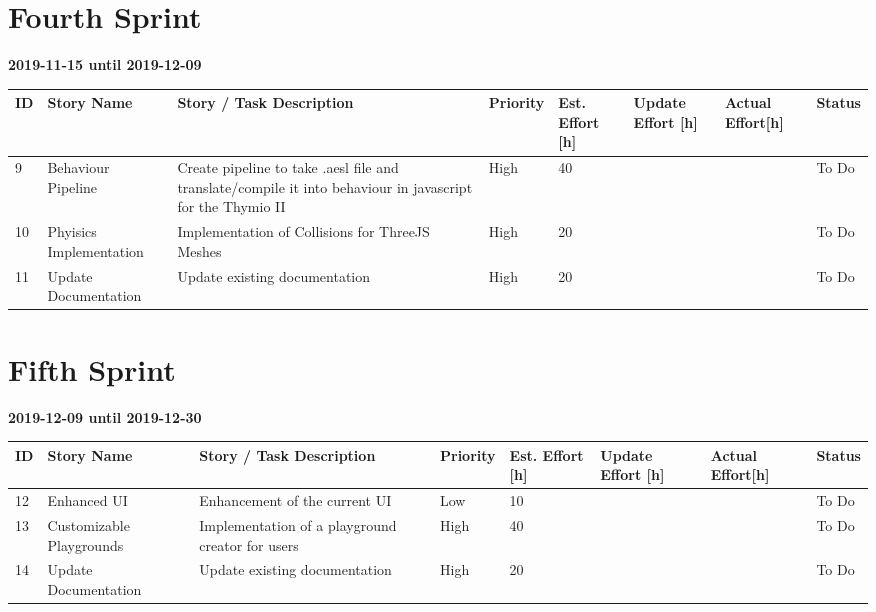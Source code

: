\documentclass{scrbook}
\begin{document}
\section{Fourth Sprint}
\textbf{2019-11-15 until 2019-12-09}
\begin{longtable}{p{5mm}|p{2cm}|p{4cm}|p{1cm}|p{1cm}|p{1cm}|p{1cm}|p{15mm}}
  ID                     & Story Name & Story / Task Description & Priority & Est. Effort {[}h{]} & Update Effort {[}h{]} & Actual Effort{[}h{]} & Status                \\ \hline
  9 & Behaviour Pipeline & Create pipeline to take .aesl file and translate/compile it into behaviour in javascript for the Thymio II & High & 40 &  &  & To Do \\ 
  10 & Phyisics Implementation & Implementation of Collisions for ThreeJS Meshes & High & 20 &  &  & To Do \\
  11 & Update Documentation & Update existing documentation & High & 20 &  &  & To Do \\ 
\end{longtable}

\section{Fifth Sprint}
\textbf{2019-12-09 until 2019-12-30}
\begin{longtable}{p{5mm}|p{2cm}|p{4cm}|p{1cm}|p{1cm}|p{1cm}|p{1cm}|p{15mm}}
  ID                     & Story Name & Story / Task Description & Priority & Est. Effort {[}h{]} & Update Effort {[}h{]} & Actual Effort{[}h{]} & Status                \\ \hline
  12 & Enhanced UI & Enhancement of the current UI & Low & 10 &  &  & To Do \\ 
  13 & Customizable Playgrounds & Implementation of a playground creator for users & High & 40 &  &  & To Do \\ 
  14 & Update Documentation & Update existing documentation & High & 20 &  &  & To Do \\ 
\end{longtable}
\end{document}
